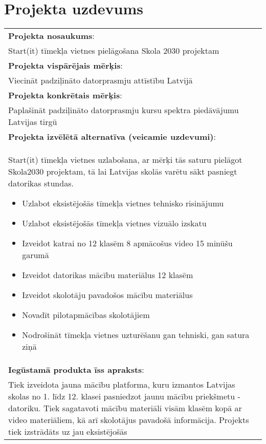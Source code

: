 \section{Projekta uzdevums}
  \label{app:Projekta_uzdevums}
    \begin{longtable}{|p{}|}
      \hline
        \textbf{Projekta nosaukums}:\\
        Start(it) tīmekļa vietnes pielāgošana Skola 2030 projektam \\
      \hline
        \textbf{Projekta vispārējais mērķis}: \\
        Viecināt padziļināto datorprasmju attīstību Latvijā \\
      \hline
        \textbf{Projekta konkrētais mērķis}: \\
        Paplašināt padziļināto datorprasmju kursu spektra piedāvājumu Latvijas tirgū \\
      \hline
        \textbf{Projekta izvēlētā alternatīva (veicamie uzdevumi)}:\\
        Start(it) tīmekļa vietnes uzlabošana, ar mērķi tās saturu pielāgot Skola2030 projektam,
        tā lai Latvijas skolās varētu sākt pasniegt datorikas stundas.
        \begin{itemize}
          \item Uzlabot eksistējošās tīmekļa vietnes tehnisko risinājumu
          \item Uzlabot eksistējošās tīmekļa vietnes vizuālo izskatu
          \item Izveidot katrai no 12 klasēm 8 apmācošus video 15 minūšu garumā
          \item Izveidot datorikas mācību materiālus 12 klasēm
          \item Izveidot skolotāju pavadošos mācību materiālus
          \item Novadīt pilotapmācības skolotājiem
          \item Nodrošināt tīmekļa vietnes uzturēšanu gan tehniski, gan satura ziņā
        \end{itemize}\\
      \hline
        \textbf{Iegūstamā produkta īss apraksts}:\\
        Tiek izveidota jauna mācību platforma, kuru izmantos Latvijas skolas no 1. līdz 12. klasei
        pasniedzot jaunu mācību priekšmetu - datoriku. Tiek sagatavoti mācību materiāli visām klasēm kopā
        ar video materiāliem, kā arī skolotājus pavadošā informācija. Projekts tiek izstrādāts uz jau eksistējošās

\end{longtable}
